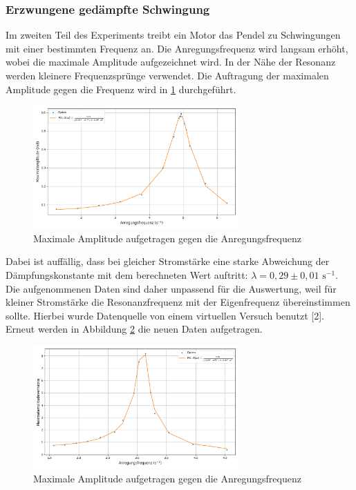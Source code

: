 \documentclass{article}
\begin{document}
\subsubsection{Erzwungene gedämpfte Schwingung}
Im zweiten Teil des Experiments treibt ein Motor das Pendel zu Schwingungen mit einer bestimmten Frequenz an. Die Anregungsfrequenz wird langsam erhöht, wobei die maximale Amplitude aufgezeichnet wird. In der Nähe der Resonanz werden kleinere Frequenzsprünge verwendet. Die Auftragung der maximalen Amplitude gegen die Frequenz wird in \ref{fig:resonanz} durchgeführt.

\begin{figure}[H]
    \centering
    \includegraphics[width=0.7\textwidth]{Figure_13.png}
    \caption{Maximale Amplitude aufgetragen gegen die Anregungsfrequenz}
    \label{fig:resonanz}
\end{figure}

Dabei ist auffällig, dass bei gleicher Stromstärke eine starke Abweichung der Dämpfungskonstante mit dem berechneten Wert auftritt: $\lambda = 0,29 \pm 0,01$ $\text{s}^{-1}$. Die aufgenommenen Daten sind daher unpassend für die Auswertung, weil für kleiner Stromstärke die Resonanzfrequenz mit der Eigenfrequenz übereinstimmen sollte. Hierbei wurde Datenquelle von einem virtuellen Versuch benutzt [2]. Erneut werden in Abbildung \ref{fig:resonanz2} die neuen Daten aufgetragen.

\begin{figure}[H]
    \centering
    \includegraphics[width=0.7\textwidth]{Figure_14.png}
    \caption{Maximale Amplitude aufgetragen gegen die Anregungsfrequenz}
    \label{fig:resonanz2}
\end{figure}
\end{document}

